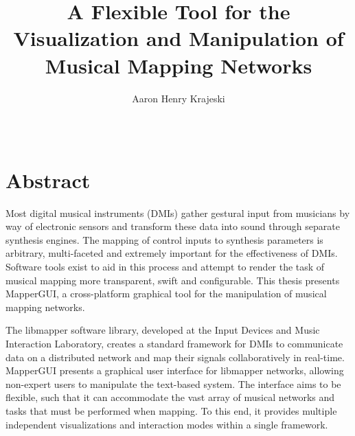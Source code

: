 \documentclass [12pt, letterpaper]{report}
\begin{document}

\title{A Flexible Tool for the Visualization and Manipulation of Musical Mapping Networks}
\author{Aaron Henry Krajeski}
\date{\Month\ \number\year}

\maketitle

\newpage
\thispagestyle{empty}
\mbox{}
\newpage

\raggedbottom
\onehalfspacing
{}


\section*{\centering Abstract}

Most digital musical instruments (DMIs) gather gestural input from musicians by way of electronic sensors and transform these data into sound through separate synthesis engines. The mapping of control inputs to synthesis parameters is arbitrary, multi-faceted and extremely important for the effectiveness of DMIs. Software tools exist to aid in this process and attempt to render the task of musical mapping more transparent, swift and configurable. This thesis presents MapperGUI, a cross-platform graphical tool for the manipulation of musical mapping networks. 

The libmapper software library, developed at the Input Devices and Music Interaction Laboratory, creates a standard framework for DMIs to communicate data on a distributed network and map their signals collaboratively in real-time. MapperGUI presents a graphical user interface for libmapper networks, allowing non-expert users to manipulate the text-based system. The interface aims to be flexible, such that it can accommodate the vast array of musical networks and tasks that must be performed when mapping. To this end, it provides multiple independent visualizations and interaction modes within a single framework. 
\end{document}
